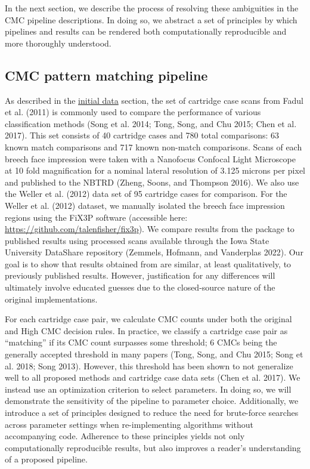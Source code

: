 In the next section, we describe the process of resolving these ambiguities in the CMC pipeline descriptions.
In doing so, we abstract a set of principles by which pipelines and results can be rendered both computationally reproducible and more thoroughly understood.

\hypertarget{investigation}{%
\subsection{CMC pattern matching pipeline}\label{investigation}}

As described in the \protect\hyperlink{initialData}{initial data} section, the set of cartridge case scans from Fadul et al. (2011) is commonly used to compare the performance of various classification methods (Song et al. 2014; Tong, Song, and Chu 2015; Chen et al. 2017).
This set consists of 40 cartridge cases and 780 total comparisons: 63 known match comparisons and 717 known non-match comparisons.
Scans of each breech face impression were taken with a Nanofocus Confocal Light Microscope at 10 fold magnification for a nominal lateral resolution of 3.125 microns per pixel and published to the NBTRD (Zheng, Soons, and Thompson 2016).
We also use the Weller et al. (2012) data set of 95 cartridge cases for comparison.
For the Weller et al. (2012) dataset, we manually isolated the breech face impression regions using the FiX3P software (accessible here: \url{https://github.com/talenfisher/fix3p}).
We compare results from the  package to published results using processed scans available through the Iowa State University DataShare repository (Zemmels, Hofmann, and Vanderplas 2022).
Our goal is to show that results obtained from  are similar, at least qualitatively, to previously published results.
However, justification for any differences will ultimately involve educated guesses due to the closed-source nature of the original implementations.

For each cartridge case pair, we calculate CMC counts under both the original and High CMC decision rules.
In practice, we classify a cartridge case pair as ``matching'' if its CMC count surpasses some threshold; 6 CMCs being the generally accepted threshold in many papers (Tong, Song, and Chu 2015; Song et al. 2018; Song 2013).
However, this threshold has been shown to not generalize well to all proposed methods and cartridge case data sets (Chen et al. 2017).
We instead use an optimization criterion to select parameters.
In doing so, we will demonstrate the sensitivity of the pipeline to parameter choice.
Additionally, we introduce a set of principles designed to reduce the need for brute-force searches across parameter settings when re-implementing algorithms without accompanying code.
Adherence to these principles yields not only computationally reproducible results, but also improves a reader's understanding of a proposed pipeline.

